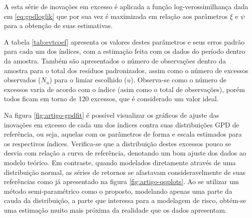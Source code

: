 \documentclass[1p]{elsarticle}
\theoremstyle{definition}
\begin{document}
A esta série de inovações em excesso é aplicada a função log-verossimilhança dada em \eqref{eq:gpdloglik} que por sua vez é maximizada em relação aos parâmetros $\xi$ e $\psi$ para a obtenção de suas estimativas.

A tabela \ref{tab:evtcoef} apresenta os valores destes parâmetros e seus erros padrão para cada um dos índices, com a estimação feita com os dados do período dentro da amostra. Também são apresentados o número de observações dentro da amostra para o total dos resíduos padronizados, assim como o número de excessos observados ($N_u$) para o limiar escolhido ($u$). Observa-se como o número de excessos varia de acordo com o índice (asim como o total de observações), porém todos ficam em torno de 120 excessos, que é considerado um valor ideal. 

	

Na figura \ref{fig:artigo-gpdfit} é possível visualizar os gráficos de ajuste das inovações em excesso de cada um dos índices contra suas distribuições GPD de referência, ou seja, aquelas com os parâmetros de forma e escala estimados para os respectivos índices. Verifica-se que a distribuição destes excessos pouco se desvia com relação a curva de referência, denotando um bom ajuste dos dados ao modelo teórico. Em contraste, quando modelados diretamente através de uma distribuição normal, as séries de retornos se afastavam consideravelmente de suas referências como já apresentado na figura \ref{fig:artigo-qqplots}. Ao se utilizar um método semi-paramétrico como o proposto, modelando apenas uma parte da cauda da distribuição, a parte que interessa para a modelagem de risco, obtém-se uma estimação muito mais próxima da realidade que os dados apresentam.
\end{document}
